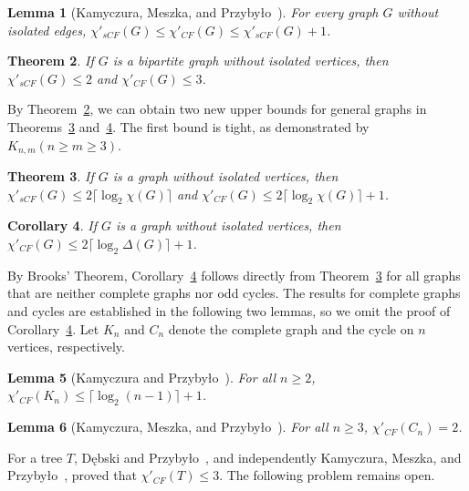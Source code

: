 \documentclass[11pt]{article}
\theoremstyle{plain}
\newtheorem{thm}{Theorem}[section]
\newtheorem{lem}[thm]{Lemma}
\newtheorem{coro}[thm]{Corollary}
\numberwithin{equation}{section}
\begin{document}
\begin{lem}[Kamyczura, Meszka, and Przyby{\l}o~\cite{KamyczuraMeszkaPrzybylo2024}]
\label{lem:basic-relation}
For every graph $G$ without isolated edges, $\chi'_{sCF}(G)\le \chi'_{CF}(G)\le \chi'_{sCF}(G)+1$.
\end{lem}

\begin{thm}\label{thm:bipartite}
If $G$ is a bipartite graph without isolated vertices, then $\chi'_{sCF}(G)\le 2$ and $\chi'_{CF}(G)\le 3$.
\end{thm}


By Theorem~\ref{thm:bipartite}, we can obtain two new upper bounds for general graphs in Theorems~\ref{thm:general-bound} and~\ref{thm:Delta}. The first
bound is tight, as demonstrated by $K_{n,m}(n\ge m\ge 3)$.

\begin{thm}
\label{thm:general-bound}
If $G$ is a graph without isolated vertices, then $\chi'_{sCF}(G)\le 2\lceil\log_2\chi(G)\rceil$ and $\chi'_{CF}(G)\le 2\lceil\log_2\chi(G)\rceil+1$.
\end{thm}

\begin{coro}
\label{thm:Delta}
If $G$ is a graph without isolated vertices, then $\chi'_{CF}(G)\le 2\lceil\log_2\Delta(G)\rceil+1$.
\end{coro}

By Brooks' Theorem, Corollary~\ref{thm:Delta} follows directly from Theorem~\ref{thm:general-bound} for all graphs that are neither complete graphs nor odd cycles. The results for complete graphs and cycles are established in the following two lemmas, so we omit the proof of Corollary~\ref{thm:Delta}. Let $K_n$ and $C_n$ denote the complete graph and the cycle on $n$ vertices, respectively.

\begin{lem}[Kamyczura and Przyby{\l}o~\cite{KP2026}]
\label{lem:complete-delta}
For all $n\ge 2$, $\chi'_{CF}(K_n)\le \lceil\log_2(n-1)\rceil+1$.
\end{lem}

\begin{lem}[Kamyczura, Meszka, and Przyby{\l}o~\cite{KamyczuraMeszkaPrzybylo2024}]
\label{lem:cycle}
For all $n\ge 3$, $\chi'_{CF}(C_n)=2$.
\end{lem}

For a tree $T$, D\k{e}bski and Przyby{\l}o~\cite{DebskiPrzybylo2022}, and independently Kamyczura, Meszka, and Przyby{\l}o~\cite{KamyczuraMeszkaPrzybylo2024}, proved that $\chi'_{CF}(T)\le 3$. The following problem remains open.
\end{document}
